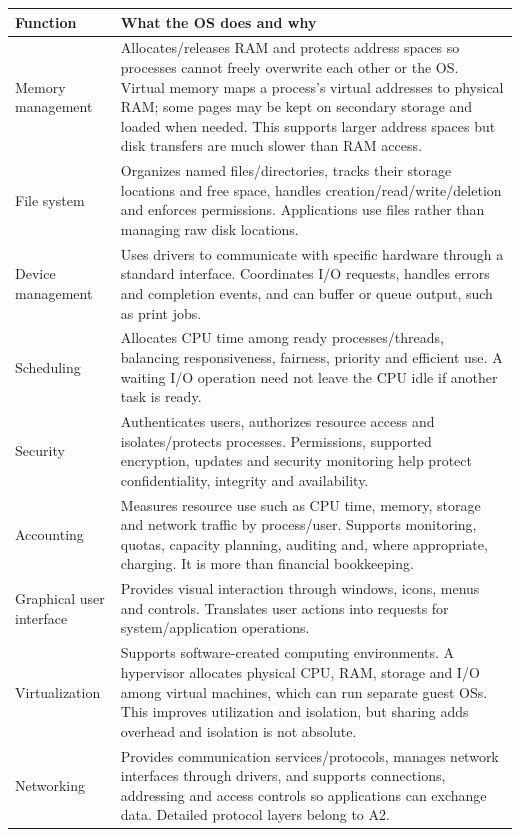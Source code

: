 \documentclass[a4paper,12pt]{article}
\begin{document}
\begin{center}
\begin{tabularx}{0.98\linewidth}{p{3.1cm} X}
\toprule
\textbf{Function} & \textbf{What the OS does and why} \\
\midrule
Memory management & Allocates/releases RAM and protects address spaces so processes cannot freely overwrite each other or the OS. Virtual memory maps a process's virtual addresses to physical RAM; some pages may be kept on secondary storage and loaded when needed. This supports larger address spaces but disk transfers are much slower than RAM access. \\
File system & Organizes named files/directories, tracks their storage locations and free space, handles creation/read/write/deletion and enforces permissions. Applications use files rather than managing raw disk locations. \\
Device management & Uses drivers to communicate with specific hardware through a standard interface. Coordinates I/O requests, handles errors and completion events, and can buffer or queue output, such as print jobs. \\
Scheduling & Allocates CPU time among ready processes/threads, balancing responsiveness, fairness, priority and efficient use. A waiting I/O operation need not leave the CPU idle if another task is ready. \\
Security & Authenticates users, authorizes resource access and isolates/protects processes. Permissions, supported encryption, updates and security monitoring help protect confidentiality, integrity and availability. \\
Accounting & Measures resource use such as CPU time, memory, storage and network traffic by process/user. Supports monitoring, quotas, capacity planning, auditing and, where appropriate, charging. It is more than financial bookkeeping. \\
Graphical user interface & Provides visual interaction through windows, icons, menus and controls. Translates user actions into requests for system/application operations. \\
Virtualization & Supports software-created computing environments. A hypervisor allocates physical CPU, RAM, storage and I/O among virtual machines, which can run separate guest OSs. This improves utilization and isolation, but sharing adds overhead and isolation is not absolute. \\
Networking & Provides communication services/protocols, manages network interfaces through drivers, and supports connections, addressing and access controls so applications can exchange data. Detailed protocol layers belong to A2. \\
\bottomrule
\end{tabularx}
\end{center}
\end{document}
